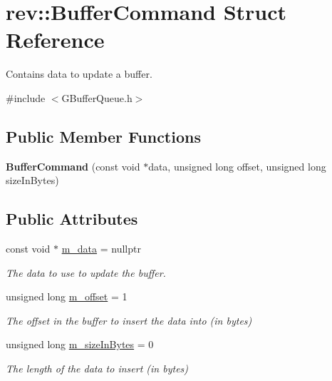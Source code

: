 \hypertarget{structrev_1_1_buffer_command}{}\section{rev\+::Buffer\+Command Struct Reference}
\label{structrev_1_1_buffer_command}


Contains data to update a buffer.  




{\ttfamily \#include $<$G\+Buffer\+Queue.\+h$>$}

\subsection*{Public Member Functions}
\begin{DoxyCompactItemize}
\item 
\mbox{\label{structrev_1_1_buffer_command_ab70b2cc583e4629ea7fb66ff25e2dd41}} 
{\bfseries Buffer\+Command} (const void $\ast$data, unsigned long offset, unsigned long size\+In\+Bytes)
\end{DoxyCompactItemize}
\subsection*{Public Attributes}
\begin{DoxyCompactItemize}
\item 
\mbox{\label{structrev_1_1_buffer_command_aeab246011985a6c79a449829f48660ba}} 
const void $\ast$ \mbox{\hyperlink{structrev_1_1_buffer_command_aeab246011985a6c79a449829f48660ba}{m\+\_\+data}} = nullptr
\begin{DoxyCompactList}\small\item\em The data to use to update the buffer. \end{DoxyCompactList}\item 
\mbox{\label{structrev_1_1_buffer_command_a9c8c6cc57e7b5a2558120c8dd4c10c1f}} 
unsigned long \mbox{\hyperlink{structrev_1_1_buffer_command_a9c8c6cc57e7b5a2558120c8dd4c10c1f}{m\+\_\+offset}} = 1
\begin{DoxyCompactList}\small\item\em The offset in the buffer to insert the data into (in bytes) \end{DoxyCompactList}\item 
\mbox{\label{structrev_1_1_buffer_command_a66dd4392b01e87612da5c906811c0770}} 
unsigned long \mbox{\hyperlink{structrev_1_1_buffer_command_a66dd4392b01e87612da5c906811c0770}{m\+\_\+size\+In\+Bytes}} = 0
\begin{DoxyCompactList}\small\item\em The length of the data to insert (in bytes) \end{DoxyCompactList}\end{DoxyCompactItemize}


